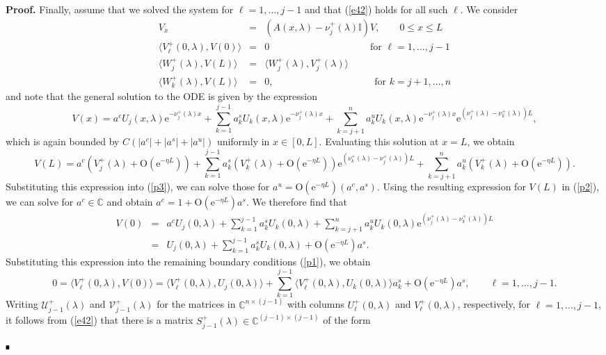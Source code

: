 \documentclass[10pt]{article}
\newenvironment{Proof}[1][.]%
 {\begin{trivlist}\item[]\textbf{Proof#1 }}%
 {\hspace*{\fill}$\rule{0.3\baselineskip}{0.35\baselineskip}$\end{trivlist}}
\numberwithin{equation}{section}
\def\id{\mathbb{I}}
\newcommand{\C}{\mathbb{C}}
\newcommand{\rme}{\mathrm{e}}
\newcommand{\rmO}{\mathrm{O}}
\begin{document}
\begin{Proof}
Finally, assume that we solved the system for $\ell=1,\ldots,j-1$ and that (\ref{e42}) holds for all such $\ell$. We consider 
\begin{eqnarray}
V_x & = & (A(x,\lambda)-\nu^+_j(\lambda)\id)V, \qquad 0\leq x\leq L \nonumber \\ \label{p1}
\langle V^+_\ell(0,\lambda),V(0)\rangle & = & 0 \qquad\qquad\qquad\qquad\qquad \mbox{ for } \ell=1,\ldots,j-1 \\ \label{p2}
\langle W^+_j(\lambda),V(L)\rangle & = & \langle W^+_j(\lambda),V^+_j(\lambda)\rangle \\ \label{p3}
\langle W^+_k(\lambda),V(L)\rangle & = & 0, \qquad\qquad\qquad\qquad\qquad \mbox{ for } k=j+1,\ldots,n
\end{eqnarray}
and note that the general solution to the ODE is given by the expression
\[
V(x) = a^c U_j(x,\lambda) \rme^{-\nu^+_j(\lambda)x} + \sum_{k=1}^{j-1} a^s_k U_k(x,\lambda) \rme^{-\nu^+_j(\lambda)x} + \sum_{k=j+1}^{n} a^u_k U_k(x,\lambda) \rme^{-\nu^+_j(\lambda)x} \rme^{(\nu^+_j(\lambda)-\nu^+_k(\lambda))L},
\]
which is again bounded by $C(|a^c|+|a^s|+|a^u|)$ uniformly in $x\in[0,L]$. Evaluating this solution at $x=L$, we obtain
\[
V(L) = a^c (V^+_j(\lambda)+\rmO(\rme^{-\eta L})) + \sum_{k=1}^{j-1} a^s_k (V^+_k(\lambda)+\rmO(\rme^{-\eta L})) \rme^{(\nu^+_k(\lambda)-\nu^+_j(\lambda))L} + \sum_{k=j+1}^{n} a^u_k (V^+_k(\lambda)+\rmO(\rme^{-\eta L})).
\]
Substituting this expression into (\ref{p3}), we can solve those for $a^u=\rmO(\rme^{-\eta L})(a^c,a^s)$. Using the resulting expression for $V(L)$ in (\ref{p2}), we can solve for $a^c\in\C$ and obtain $a^c=1+\rmO(\rme^{-\eta L})a^s$. We therefore find that
\begin{eqnarray*}
V(0) & = & a^c U_j(0,\lambda) + \sum_{k=1}^{j-1} a^s_k U_k(0,\lambda) + \sum_{k=j+1}^{n} a^u_k U_k(0,\lambda) \rme^{(\nu^+_j(\lambda)-\nu^+_k(\lambda))L} \\ & = &
U_j(0,\lambda) + \sum_{k=1}^{j-1} a^s_k U_k(0,\lambda) + \rmO(\rme^{-\eta L}) a^s.
\end{eqnarray*}
Substituting this expression into the remaining boundary conditions (\ref{p1}), we obtain
\begin{equation}\label{p0}
0 = \langle V^+_\ell(0,\lambda),V(0)\rangle = \langle V^+_\ell(0,\lambda), U_j(0,\lambda) \rangle
+ \sum_{k=1}^{j-1} \langle V^+_\ell(0,\lambda),U_k(0,\lambda) \rangle a^s_k + \rmO(\rme^{-\eta L})a^s, \qquad
\ell=1,\ldots,j-1.
\end{equation}
Writing $\mathcal{U}^+_{j-1}(\lambda)$ and $\mathcal{V}^+_{j-1}(\lambda)$ for the matrices in $\C^{n\times(j-1)}$ with columns $U^+_\ell(0,\lambda)$ and $V^+_\ell(0,\lambda)$, respectively, for $\ell=1,\ldots,j-1$, it follows from (\ref{e42}) that there is a matrix $S^+_{j-1}(\lambda)\in\C^{(j-1)\times(j-1)}$ of the form

\end{Proof}
\end{document}
